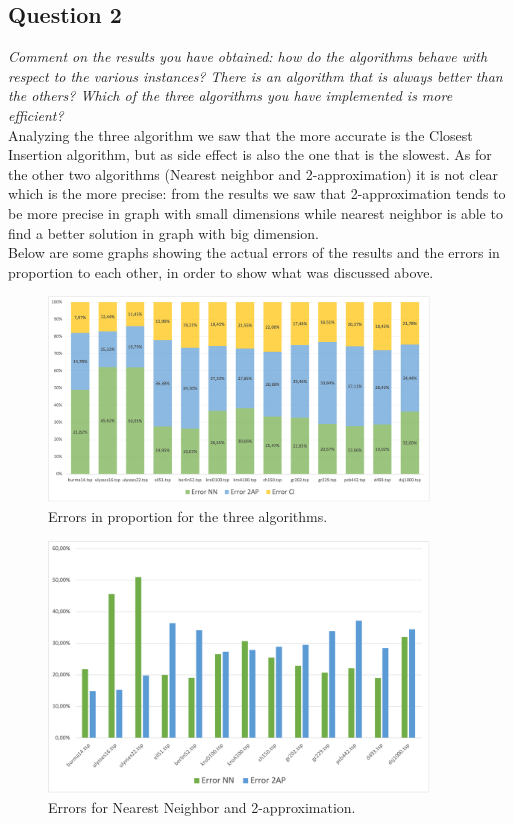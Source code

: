 \subsection{Question 2}
\textit{Comment on the results you have obtained: how do the algorithms behave with respect to the various 
instances? There is an algorithm that is always better than the others? Which of the three algorithms you 
have implemented is more efficient?} \\

\noindent
Analyzing the three algorithm we saw that the more accurate is the Closest Insertion algorithm, but as side effect is also the one that is the slowest.
As for the other two algorithms (Nearest neighbor and 2-approximation) it is not clear which is the more precise: from the results we saw that 2-approximation tends to be more precise in graph with small dimensions while nearest neighbor is able to find a better solution in graph with big dimension.\\
Below are some graphs showing the actual errors of the results and the errors in proportion to each other, in order to show what was discussed above.

\begin{figure}[H]
    \centering
    \includegraphics[width=0.9\textwidth]{./img/errore_in_proporzione_ord.png}
    \caption{Errors in proportion for the three algorithms.}
    \label{fig:proportion_error_ord}
\end{figure}

\begin{figure}[H]
    \centering
    \includegraphics[width=0.9\textwidth]{./img/error_nn_2ap.png}
    \caption{Errors for Nearest Neighbor and 2-approximation.}
    \label{fig:error_nn_2ap}
\end{figure}

